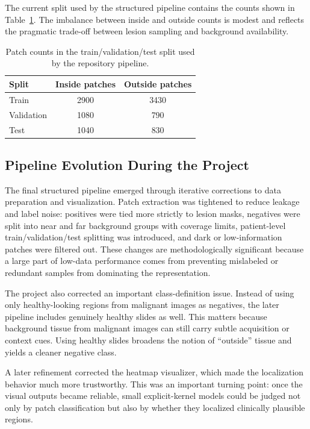 \documentclass{cernatsnote}
\let\oldsubsection\subsection
\let\oldsubsubsection\subsubsection
\let\section\oldsubsection
\let\subsection\oldsubsubsection
\begin{document}
The current split used by the structured pipeline contains the counts shown in Table~\ref{tab:patchcounts}. The imbalance between inside and outside counts is modest and reflects the pragmatic trade-off between lesion sampling and background availability.

\begin{table}[H]
\centering
\caption{Patch counts in the train/validation/test split used by the repository pipeline.}
\label{tab:patchcounts}
\begin{tabular}{lcc}
\toprule
Split & Inside patches & Outside patches \\
\midrule
Train & 2900 & 3430 \\
Validation & 1080 & 790 \\
Test & 1040 & 830 \\
\bottomrule
\end{tabular}
\end{table}

\section{Pipeline Evolution During the Project}
The final structured pipeline emerged through iterative corrections to data preparation and visualization. Patch extraction was tightened to reduce leakage and label noise: positives were tied more strictly to lesion masks, negatives were split into near and far background groups with coverage limits, patient-level train/validation/test splitting was introduced, and dark or low-information patches were filtered out. These changes are methodologically significant because a large part of low-data performance comes from preventing mislabeled or redundant samples from dominating the representation.

The project also corrected an important class-definition issue. Instead of using only healthy-looking regions from malignant images as negatives, the later pipeline includes genuinely healthy slides as well. This matters because background tissue from malignant images can still carry subtle acquisition or context cues. Using healthy slides broadens the notion of ``outside'' tissue and yields a cleaner negative class.

A later refinement corrected the heatmap visualizer, which made the localization behavior much more trustworthy. This was an important turning point: once the visual outputs became reliable, small explicit-kernel models could be judged not only by patch classification but also by whether they localized clinically plausible regions.
\end{document}
